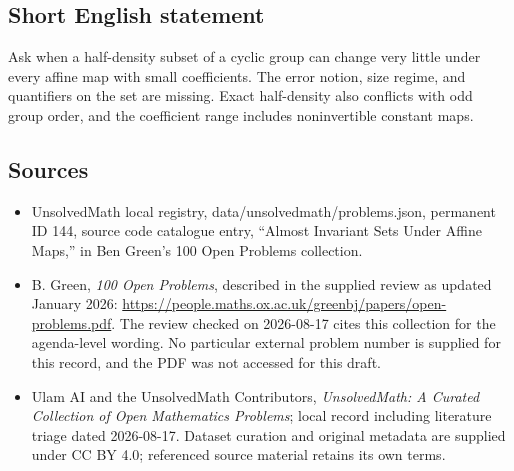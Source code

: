 \documentclass[11pt]{article}
\begin{document}
\subsection{Short English statement}
Ask when a half-density subset of a cyclic group can change very little under every affine map with small coefficients. The error notion, size regime, and quantifiers on the set are missing. Exact half-density also conflicts with odd group order, and the coefficient range includes noninvertible constant maps.
\subsection{Sources}
\begin{itemize}
\item UnsolvedMath local registry, data/unsolvedmath/problems.json, permanent ID 144, source code catalogue entry, ``Almost Invariant Sets Under Affine Maps,'' in Ben Green's 100 Open Problems collection.
\item B. Green, \emph{100 Open Problems}, described in the supplied review as updated January 2026: \url{https://people.maths.ox.ac.uk/greenbj/papers/open-problems.pdf}. The review checked on 2026-08-17 cites this collection for the agenda-level wording. No particular external problem number is supplied for this record, and the PDF was not accessed for this draft.
\item Ulam AI and the UnsolvedMath Contributors, \emph{UnsolvedMath: A Curated Collection of Open Mathematics Problems}; local record including literature triage dated 2026-08-17. Dataset curation and original metadata are supplied under CC BY 4.0; referenced source material retains its own terms.
\end{itemize}
\end{document}
